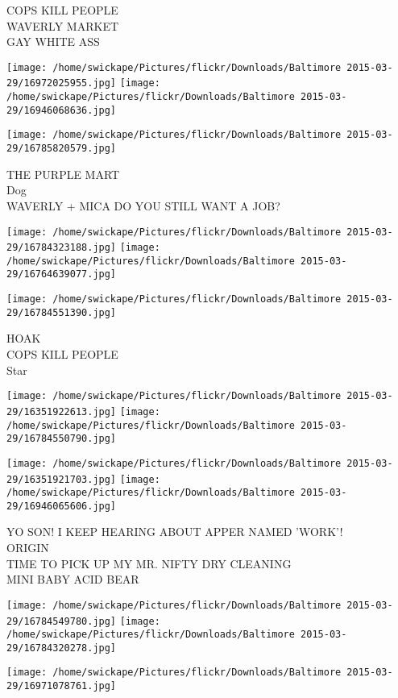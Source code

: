\documentclass[10pt,letterpaper]{article}
\begin{document}
COPS KILL PEOPLE\\
WAVERLY MARKET\\
GAY WHITE ASS
\pagebreak

\texttt{[image: /home/swickape/Pictures/flickr/Downloads/Baltimore 2015-03-29/16972025955.jpg]}
\texttt{[image: /home/swickape/Pictures/flickr/Downloads/Baltimore 2015-03-29/16946068636.jpg]}

\vspace{0.25in}
\texttt{[image: /home/swickape/Pictures/flickr/Downloads/Baltimore 2015-03-29/16785820579.jpg]}

THE PURPLE MART\\
Dog\\
WAVERLY + MICA DO YOU STILL WANT A JOB?
\pagebreak

\texttt{[image: /home/swickape/Pictures/flickr/Downloads/Baltimore 2015-03-29/16784323188.jpg]}
\texttt{[image: /home/swickape/Pictures/flickr/Downloads/Baltimore 2015-03-29/16764639077.jpg]}

\vspace{0.25in}
\texttt{[image: /home/swickape/Pictures/flickr/Downloads/Baltimore 2015-03-29/16784551390.jpg]}

HOAK\\
COPS KILL PEOPLE\\
Star
\pagebreak

\texttt{[image: /home/swickape/Pictures/flickr/Downloads/Baltimore 2015-03-29/16351922613.jpg]}
\texttt{[image: /home/swickape/Pictures/flickr/Downloads/Baltimore 2015-03-29/16784550790.jpg]}

\texttt{[image: /home/swickape/Pictures/flickr/Downloads/Baltimore 2015-03-29/16351921703.jpg]}
\texttt{[image: /home/swickape/Pictures/flickr/Downloads/Baltimore 2015-03-29/16946065606.jpg]}

YO SON!  I KEEP HEARING ABOUT APPER NAMED 'WORK'!\\
ORIGIN\\
TIME TO PICK UP MY MR. NIFTY DRY CLEANING\\
MINI BABY ACID BEAR
\pagebreak

\texttt{[image: /home/swickape/Pictures/flickr/Downloads/Baltimore 2015-03-29/16784549780.jpg]}
\texttt{[image: /home/swickape/Pictures/flickr/Downloads/Baltimore 2015-03-29/16784320278.jpg]}

\texttt{[image: /home/swickape/Pictures/flickr/Downloads/Baltimore 2015-03-29/16971078761.jpg]}
\end{document}
